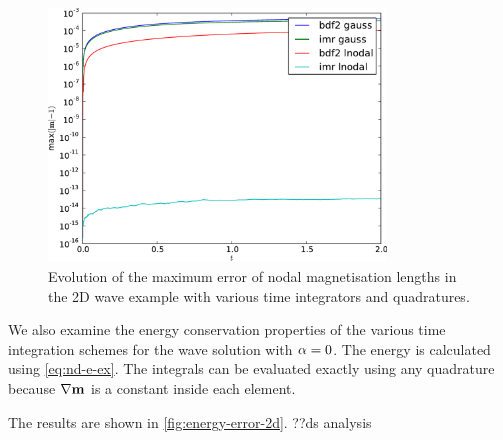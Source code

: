 \begin{figure}
  \centering
  \includegraphics[width=0.8\textwidth]{plots/2d_wave_solution_m_length/mlengtherrormaxesvstimes}
  \caption{Evolution of the maximum error of nodal magnetisation lengths in the 2D wave example with various time integrators and quadratures.}
  \label{fig:mean-ml-error-2d}
\end{figure}



We also examine the energy conservation properties of the various time integration schemes for the wave solution with $\alpha = 0$.
The energy is calculated using \cref{eq:nd-e-ex}.
The integrals can be evaluated exactly using any quadrature because $\nabla \boldsymbol{\mathrm{m}}$ is a constant inside each element.

The results are shown in \cref{fig:energy-error-2d}.
??ds analysis

